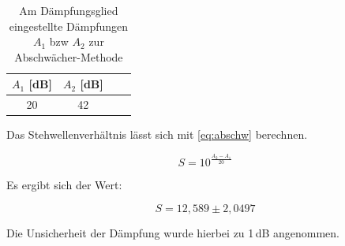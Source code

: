 \begin{table}
\centering
\caption{Am Dämpfungsglied eingestellte Dämpfungen $A_1$ bzw $A_2$ zur Abschwächer-Methode}
\begin{tabular}{c c c c}
\toprule
{$A_1$ [dB]} & {$A_2$ [dB]}\\
\midrule
20 & 42
\bottomrule
\label{tab:abschw}
\end{tabular}
\end{table}

Das Stehwellenverhältnis lässt sich mit \autoref{eq:abschw} berechnen.

\begin{equation}
S = 10^{\frac{A_2 - A_1}{20}}
\label{eq:abschw}
\end{equation}

Es ergibt sich der Wert:

\begin{equation}
S = 12,589 \pm 2,0497
\label{eq:abschw2}
\end{equation}

Die Unsicherheit der Dämpfung wurde hierbei zu 1\,dB angenommen.





































